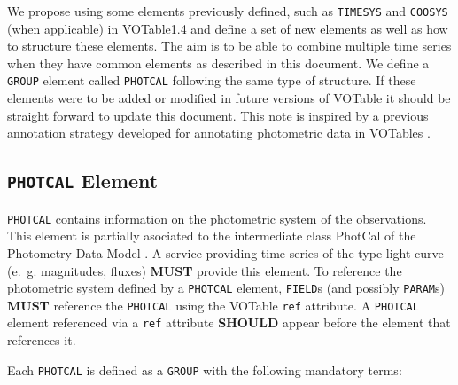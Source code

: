 \documentclass[11pt,a4paper]{ivoa}
\let\fg=\color
\def\attr#1{{\tt{\fg{DarkRed}#1}}}
\def\elem#1{{\tt{\fg{DarkRed}#1}}}
\def\attrval#1#2{{\tt{\fg{DarkRed}#1}="{\fg{DarkPurple}#2}"}}
\begin{document}
We propose using some elements previously defined, such as \elem{TIMESYS} and \elem{COOSYS} (when applicable) in VOTable1.4 \cite{VOTable1.4} and define a set of new elements as well as how to structure these elements. The aim is to be able to combine multiple time series when they have common elements as described in this document. We define a \elem{GROUP} element called \elem{PHOTCAL} following the same type of structure. If these elements were to be added or modified in future versions of VOTable it should be straight forward to update this document. This note is inspired by a previous annotation strategy developed for annotating photometric data in VOTables \citep{note:seb2010-1}.

%
%

\subsection{\elem{PHOTCAL} Element}
\elem{PHOTCAL} contains information on the photometric system of the observations. This element is partially asociated to the intermediate class PhotCal of the Photometry Data Model \cite{PhotometryDM}. A service providing time series of the type light-curve (e.~g. magnitudes, fluxes) \textbf{MUST} provide this element. To reference the photometric system defined by a \elem{PHOTCAL} element, \elem{FIELD}s (and possibly \elem{PARAM}s) \textbf{MUST} reference the \elem{PHOTCAL} using the VOTable \attr{ref} attribute. A \elem{PHOTCAL} element referenced via a \attr{ref} attribute \textbf{SHOULD} appear before the element that references it. 

Each \elem{PHOTCAL} is defined as a \elem{GROUP} with the following mandatory terms:
\end{document}
